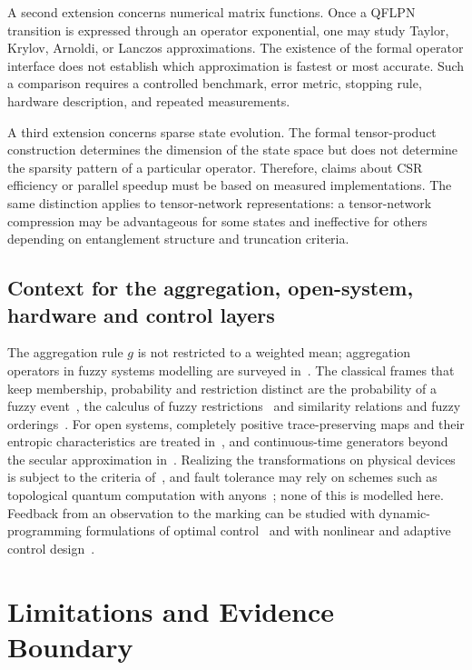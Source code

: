 \documentclass[final,3p,times]{elsarticle}
\begin{document}
A second extension concerns numerical matrix functions. Once a QFLPN transition is expressed through an operator exponential, one may study Taylor, Krylov, Arnoldi, or Lanczos approximations. The existence of the formal operator interface does not establish which approximation is fastest or most accurate. Such a comparison requires a controlled benchmark, error metric, stopping rule, hardware description, and repeated measurements.

A third extension concerns sparse state evolution. The formal tensor-product construction determines the dimension of the state space but does not determine the sparsity pattern of a particular operator. Therefore, claims about CSR efficiency or parallel speedup must be based on measured implementations. The same distinction applies to tensor-network representations: a tensor-network compression may be advantageous for some states and ineffective for others depending on entanglement structure and truncation criteria.



\subsection{Context for the aggregation, open-system, hardware and control layers}
The aggregation rule $g$ is not restricted to a weighted mean; aggregation operators in fuzzy systems modelling are surveyed in~\cite{ref26}. The classical frames that keep membership, probability and restriction distinct are the probability of a fuzzy event~\cite{ref24}, the calculus of fuzzy restrictions~\cite{ref22} and similarity relations and fuzzy orderings~\cite{ref23}. For open systems, completely positive trace-preserving maps and their entropic characteristics are treated in~\cite{ref37,ref31}, and continuous-time generators beyond the secular approximation in~\cite{ref32}. Realizing the transformations on physical devices is subject to the criteria of~\cite{ref33}, and fault tolerance may rely on schemes such as topological quantum computation with anyons~\cite{ref36}; none of this is modelled here. Feedback from an observation to the marking can be studied with dynamic-programming formulations of optimal control~\cite{ref34} and with nonlinear and adaptive control design~\cite{ref35}.

\section{Limitations and Evidence Boundary}
\end{document}
